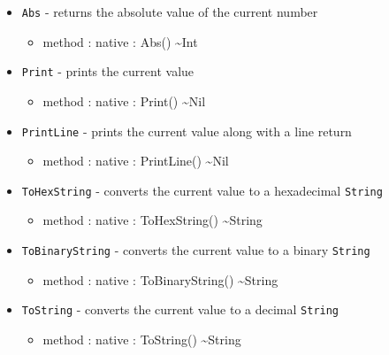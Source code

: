 \documentclass[11pt]{article}
\begin{document}
\begin{itemize}
\item \texttt{Abs} - returns the absolute value of the current number
  \begin{itemize}
  \item method : native : Abs() \textasciitilde Int
  \end{itemize}
\item \texttt{Print} - prints the current value
  \begin{itemize}
  \item method : native : Print() \textasciitilde Nil
  \end{itemize}
\item \texttt{PrintLine} - prints the current value along with a line
  return
  \begin{itemize}
  \item method : native : PrintLine() \textasciitilde Nil
  \end{itemize}
\item \texttt{ToHexString} - converts the current value to a hexadecimal
  \texttt{String}
  \begin{itemize}
  \item method : native : ToHexString() \textasciitilde String
  \end{itemize}
\item \texttt{ToBinaryString} - converts the current value to a binary
  \texttt{String}
  \begin{itemize}
  \item method : native : ToBinaryString() \textasciitilde String
  \end{itemize}
\item \texttt{ToString} - converts the current value to a decimal
  \texttt{String}
  \begin{itemize}
  \item method : native : ToString() \textasciitilde String
  \end{itemize}
\end{itemize}
\end{document}
